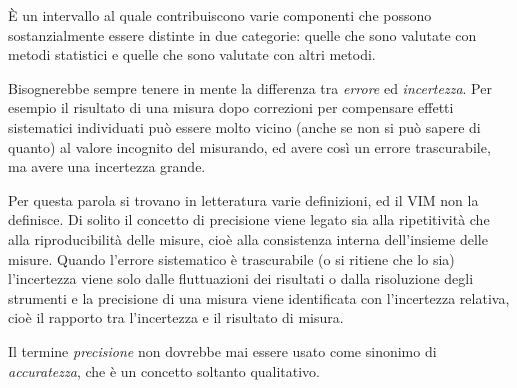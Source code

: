 \begin{exemplify}



\end{exemplify}

\begin{termslist}
\item{
{\`E un intervallo al quale contribuiscono varie componenti che possono
sostanzialmente essere distinte in due categorie: quelle che sono valutate
con metodi statistici e quelle che sono valutate con altri metodi.

Bisognerebbe sempre tenere in mente la differenza tra \emph{errore} ed
\emph{incertezza}. Per esempio il risultato di una misura dopo correzioni
per compensare effetti sistematici individuati pu\`o essere molto vicino
(anche se non si pu\`o sapere di quanto) al valore incognito del misurando,
ed avere cos\`i un errore trascurabile, ma avere una incertezza grande.}
}
\item{
{Per questa parola si trovano in letteratura varie definizioni, ed il VIM non
la definisce. Di solito il concetto di precisione viene legato sia alla
ripetitivit\`a che alla riproducibilit\`a delle misure, cio\`e alla
consistenza interna  dell'insieme delle misure. Quando l'errore sistematico
\`e trascurabile (o si ritiene che lo sia) l'incertezza viene solo dalle
fluttuazioni dei risultati o dalla risoluzione degli strumenti e la precisione
di una misura viene identificata con l'incertezza relativa, cio\`e il rapporto
tra l'incertezza e il risultato di misura.

Il termine {\em precisione} non dovrebbe mai essere usato come sinonimo di
{\em accuratezza}, che \`e un concetto soltanto qualitativo.}
}
\end{termslist}


